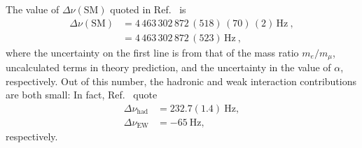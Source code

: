 The value of $\Delta \nu(\text{SM})$ quoted in Ref.~\cite{Eides:2018rph}
is
%
\begin{align}
 \Delta \nu (\text{SM}) 
&=  4 \, 463 \, 302 \, 872 \, (518) \, (70) \, (2) \, \text{Hz}~,\\
&=  4 \, 463 \, 302 \, 872 \, (523) \, \text{Hz}~,
\end{align}
%
where the uncertainty on the first line is from
that of the mass ratio $m_e/m_\mu$, uncalculated terms in 
theory prediction, and the uncertainty in the value of $\alpha$,
respectively.  Out of this number, the hadronic and
weak interaction contributions are both small: In fact,
Ref.~\cite{CODATA} quote 
%
\begin{align}
 \Delta \nu_{\text{had}} &= 232.7 (1.4) ~ {\text{Hz}} , \\
 \Delta \nu_{\text{EW}}  &= -65 ~ {\text{Hz}} , 
\end{align}
%
respectively. 


